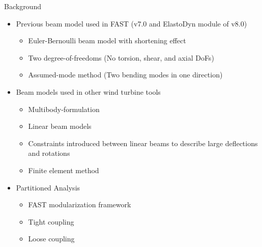 \documentclass[xcolor=cmyk]{beamer}
\begin{document}
\begin{frame}{Background}
  \begin{itemize}
    \item
    Previous beam model used in FAST (v7.0 and ElastoDyn module of v8.0)
    \begin{itemize}
      \item
      Euler-Bernoulli beam model with shortening effect
      \item
      Two degree-of-freedoms (No torsion, shear, and axial DoFs)
      \item
      Assumed-mode method (Two bending modes in one direction)
    \end{itemize}
    \item
    Beam models used in other wind turbine tools
    \begin{itemize}
        \item
        Multibody-formulation
        \item
        Linear beam models
        \item
        Constraints introduced between linear beams to describe large deflections and rotations
        \item
        Finite element method
    \end{itemize}
    \item
    Partitioned Analysis
    \begin{itemize}
        \item FAST modularization framework
        \item Tight coupling
        \item Loose coupling
    \end{itemize}
  \end{itemize}
\end{frame}
\end{document}
